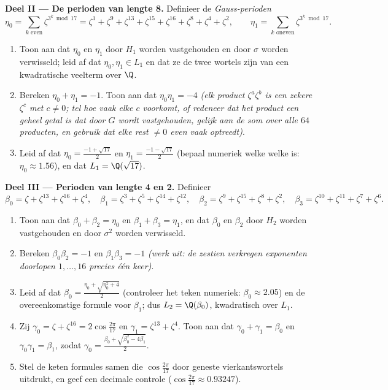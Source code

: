 \begin{problem}
\medskip
\noindent\textbf{Deel II --- De perioden van lengte 8.}
Definieer de \emph{Gauss-perioden}
\[
\eta_0 = \sum_{k \text{ even}} \zeta^{3^k \bmod 17}
= \zeta^{1} + \zeta^{9} + \zeta^{13} + \zeta^{15} + \zeta^{16} +
\zeta^{8} + \zeta^{4} + \zeta^{2},
\qquad
\eta_1 = \sum_{k \text{ oneven}} \zeta^{3^k \bmod 17}.
\]
\begin{enumerate}[resume]
  \item Toon aan dat $\eta_0$ en $\eta_1$ door $H_1$ worden
        vastgehouden en door $\sigma$ worden verwisseld; leid af
        dat $\eta_0, \eta_1 \in L_1$ en dat ze de twee wortels
        zijn van een kwadratische veelterm over $\Q$.
  \item Bereken $\eta_0 + \eta_1 = -1$. Toon aan dat
        $\eta_0\eta_1 = -4$ \emph{(elk product $\zeta^a\zeta^b$ is
        een zekere $\zeta^c$ met $c \neq 0$; tel hoe vaak elke $c$
        voorkomt, of redeneer dat het product een geheel getal is
        dat door $G$ wordt vastgehouden, gelijk aan de som over
        alle $64$ producten, en gebruik dat elke rest $\neq 0$
        even vaak optreedt)}.
  \item Leid af dat $\eta_0 = \frac{-1 + \sqrt{17}}2$ en $\eta_1 =
        \frac{-1-\sqrt{17}}2$ (bepaal numeriek welke welke is:
        $\eta_0 \approx 1.56$), en dat $L_1 = \Q(\sqrt{17})$.
\end{enumerate}

\medskip
\noindent\textbf{Deel III --- Perioden van lengte 4 en 2.}
Definieer
\[
\beta_0 = \zeta + \zeta^{13} + \zeta^{16} + \zeta^{4},\quad
\beta_1 = \zeta^3 + \zeta^5 + \zeta^{14} + \zeta^{12},\quad
\beta_2 = \zeta^9 + \zeta^{15} + \zeta^{8} + \zeta^{2},\quad
\beta_3 = \zeta^{10} + \zeta^{11} + \zeta^{7} + \zeta^{6}.
\]
\begin{enumerate}[resume]
  \item Toon aan dat $\beta_0 + \beta_2 = \eta_0$ en $\beta_1 +
        \beta_3 = \eta_1$, en dat $\beta_0$ en $\beta_2$ door
        $H_2$ worden vastgehouden en door $\sigma^2$ worden
        verwisseld.
  \item Bereken $\beta_0\beta_2 = -1$ en $\beta_1\beta_3 = -1$
        \emph{(werk uit: de zestien verkregen exponenten
        doorlopen $1, \dots, 16$ precies één keer)}.
  \item Leid af dat $\beta_0 = \frac{\eta_0 + \sqrt{\eta_0^2 +
        4}}2$ (controleer het teken numeriek: $\beta_0 \approx
        2.05$) en de overeenkomstige formule voor $\beta_1$; dus
        $L_2 = \Q(\beta_0)$, kwadratisch over $L_1$.
  \item Zij $\gamma_0 = \zeta + \zeta^{16} =
        2\cos\frac{2\pi}{17}$ en $\gamma_1 = \zeta^{13} +
        \zeta^4$. Toon aan dat $\gamma_0 + \gamma_1 = \beta_0$ en
        $\gamma_0\gamma_1 = \beta_1$, zodat $\gamma_0 =
        \frac{\beta_0 + \sqrt{\beta_0^2 - 4\beta_1}}2$.
  \item Stel de keten formules samen die $\cos\frac{2\pi}{17}$
        door geneste vierkantswortels uitdrukt, en geef een
        decimale controle ($\cos\frac{2\pi}{17} \approx
        0.93247$).
\end{enumerate}


\end{problem}
